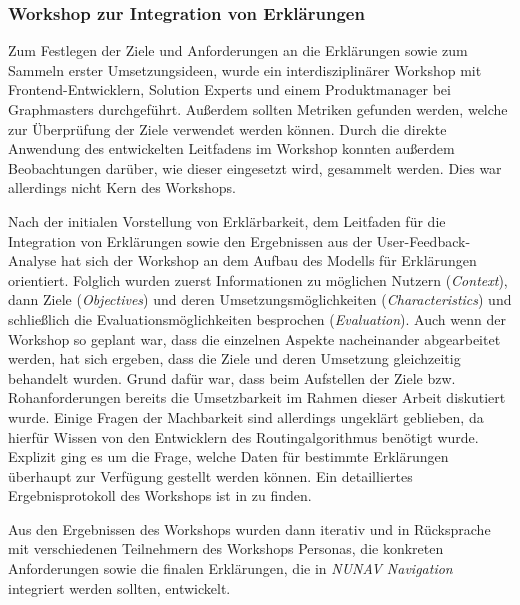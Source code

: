 \subsubsection{Workshop zur Integration von Erklärungen}

Zum Festlegen der Ziele und Anforderungen an die Erklärungen sowie zum Sammeln erster Umsetzungsideen, wurde ein interdisziplinärer Workshop mit Frontend-Entwicklern, \glqq Solution Experts\grqq{} und einem Produktmanager bei Graphmasters durchgeführt. Außerdem sollten Metriken gefunden werden, welche zur Überprüfung der Ziele verwendet werden können. Durch die direkte Anwendung des entwickelten Leitfadens im Workshop konnten außerdem Beobachtungen darüber, wie dieser eingesetzt wird, gesammelt werden. Dies war allerdings nicht Kern des Workshops. 

Nach der initialen Vorstellung von Erklärbarkeit, dem Leitfaden für die Integration von Erklärungen sowie den Ergebnissen aus der User-Feedback-Analyse hat sich der Workshop an dem Aufbau des Modells für Erklärungen orientiert. Folglich wurden zuerst Informationen zu möglichen Nutzern (\textit{Context}), dann Ziele (\textit{Objectives}) und deren Umsetzungsmöglichkeiten (\textit{Characteristics}) und schließlich die Evaluationsmöglichkeiten besprochen (\textit{Evaluation}). Auch wenn der Workshop so geplant war, dass die einzelnen Aspekte nacheinander abgearbeitet werden, hat sich ergeben, dass die Ziele und deren Umsetzung gleichzeitig behandelt wurden. Grund dafür war, dass beim Aufstellen der Ziele bzw. Rohanforderungen bereits die Umsetzbarkeit im Rahmen dieser Arbeit diskutiert wurde. Einige Fragen der Machbarkeit sind allerdings ungeklärt geblieben, da hierfür Wissen von den Entwicklern des Routingalgorithmus benötigt wurde. Explizit ging es um die Frage, welche Daten für bestimmte Erklärungen überhaupt zur Verfügung gestellt werden können. Ein detailliertes Ergebnisprotokoll des Workshops ist in  zu finden.

Aus den Ergebnissen des Workshops wurden dann iterativ und in Rücksprache mit verschiedenen Teilnehmern des Workshops Personas, die konkreten Anforderungen sowie die finalen Erklärungen, die in \textit{NUNAV Navigation} integriert werden sollten, entwickelt.